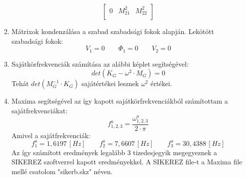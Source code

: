 \documentclass[12pt,a4paper] {article}
\begin{document}
\begin{enumerate}
\[\begin{bmatrix}
	0 &M_{21}^2 &M_{22}^2 \\
	\end{bmatrix}
	\]  
	\item Mátrixok kondenzálása a szabad szabadsági fokok alapján. Lekötött szabadsági fokok:
	\[V_{1}=0 \qquad \Phi_{1}=0 \qquad V_{2}=0\]
	\newpage
	\item Sajátkörfrekvenciák számítása az alábbi képlet segítségével:
	\[det(K_G-\omega^2 \cdot M_G)=0\]
	Tehát \(det(M_G^{-1} \cdot K_G)\) sajátértékei lesznek $\omega^2$ értékei.
	\item Maxima segítségével az így kapott sajátkörfrekvenciákból számítottam a sajátfrekvenciákat:
	\[f_{1,2,3}^a=\dfrac{\omega_{1,2,3}^a}{2\cdot \pi}\]
	Amivel a sajátfrekvenciák:	
	\[f_1^a=1,6197\, [Hz] \qquad f_2^a=7,6607\, [Hz] \qquad f_3^a=30,4388\, [Hz]  \]
	Az így számított eredmények legalább 3 tizedesjegyik megegyeznek a SIKEREZ szoftverrel kapott eredményekkel. A SIKEREZ file-t a Maxima file mellé csatolom "sikerb.skz" néven.
\end{enumerate}\par


\end{document}
